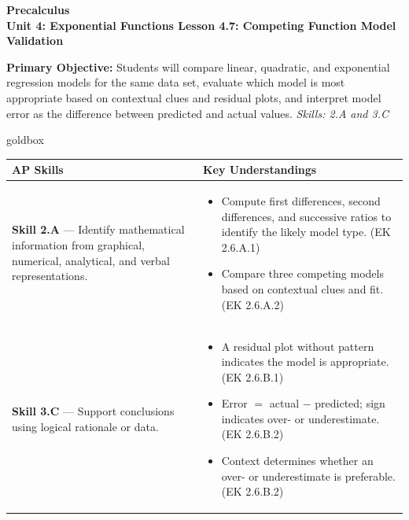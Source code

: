 \documentclass[10pt]{article}
\newcommand{\CourseName}{Precalculus}
\newcommand{\UnitNumberName}{Unit 4: Exponential Functions \quad}
\newcommand{\LessonNumberName}{Lesson 4.7: Competing Function Model Validation}
\begin{document}
\begin{center}
    {\Large\bfseries \CourseName \\
    {\small\bfseries \UnitNumberName \LessonNumberName}}
\end{center}

\begin{tcolorbox}[colback=sky, colframe=navy, boxrule=0.9pt, arc=2mm,
    left=2mm, right=2mm, top=1.5mm, bottom=1.5mm]
    \textbf{Primary Objective:} Students will compare linear, quadratic, and exponential
    regression models for the same data set, evaluate which model is most appropriate based
    on contextual clues and residual plots, and interpret model error as the difference between
    predicted and actual values.
    \hfill\textit{\small Skills: 2.A and 3.C}
\end{tcolorbox}

\renewcommand{\arraystretch}{1.6}
\begin{skillbox}{goldbox}
\begin{tabularx}{\linewidth}{@{}X X@{}}
\textbf{AP Skills} &
\textbf{Key Understandings} \\
\midrule
\textbf{Skill 2.A} --- Identify mathematical information from graphical, numerical, analytical,
and verbal representations. &
\begin{itemize}[leftmargin=1.2em,itemsep=2pt,topsep=0pt]
  \item Compute first differences, second differences, and successive ratios to identify the
        likely model type. (EK 2.6.A.1)
  \item Compare three competing models based on contextual clues and fit. (EK 2.6.A.2)
\end{itemize} \\
\textbf{Skill 3.C} --- Support conclusions using logical rationale or data. &
\begin{itemize}[leftmargin=1.2em,itemsep=2pt,topsep=0pt]
  \item A residual plot without pattern indicates the model is appropriate. (EK 2.6.B.1)
  \item Error $=$ actual $-$ predicted; sign indicates over- or underestimate. (EK 2.6.B.2)
  \item Context determines whether an over- or underestimate is preferable. (EK 2.6.B.2)
\end{itemize} \\
\end{tabularx}
\end{skillbox}
\end{document}
